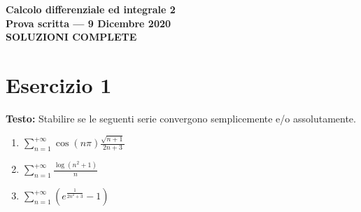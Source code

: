 \documentclass[12pt, a4paper]{article}
\begin{document}
\begin{center}
\Large\textbf{Calcolo differenziale ed integrale 2}\\
\large\textbf{Prova scritta --- 9 Dicembre 2020}\\
\large\textbf{SOLUZIONI COMPLETE}
\end{center}

\vspace{1cm}

\section*{Esercizio 1}

\textbf{Testo:} Stabilire se le seguenti serie convergono semplicemente e/o assolutamente.
\begin{enumerate}
    \item $\displaystyle\sum_{n=1}^{+\infty} \cos(n\pi) \frac{\sqrt{n+1}}{2n+3}$
    \item $\displaystyle\sum_{n=1}^{+\infty} \frac{\log(n^{2}+1)}{n}$
    \item $\displaystyle\sum_{n=1}^{+\infty} \left(e^{\frac{1}{2n^{2}+3}} - 1\right)$
\end{enumerate}
\end{document}
